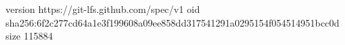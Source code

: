 version https://git-lfs.github.com/spec/v1
oid sha256:6f2c277cd64a1e3f199608a09ee858dd317541291a0295154f054514951bcc0d
size 115884
